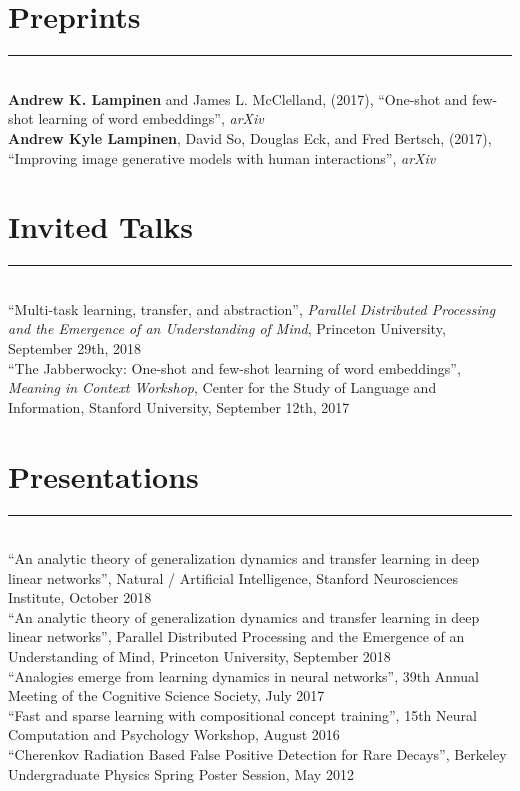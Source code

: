 \documentclass[margin]{res}
\begin{document}
\begin{resume}
\vspace{1pt}\section{Preprints} \vspace{-15pt} \rule{\textwidth}{0.5pt} \\[3pt]
\textbf{Andrew K. Lampinen} and James L. McClelland, (2017), {``One-shot and few-shot learning of word embeddings''}, \textit{arXiv} \\ [3pt] 
\textbf{Andrew Kyle Lampinen}, David So, Douglas Eck, and Fred Bertsch, (2017), {``Improving image generative models with human interactions''}, \textit{arXiv} 

\vspace{1pt}\section{Invited Talks} \vspace{-15pt} \rule{\textwidth}{0.5pt} \\[3pt]
{``Multi-task learning, transfer, and abstraction''}, \textit{Parallel Distributed Processing and the Emergence of an Understanding of Mind}, Princeton University, September 29th, 2018\\[3pt] 
{``The Jabberwocky: One-shot and few-shot learning of word embeddings''}, \textit{Meaning in Context Workshop}, Center for the Study of Language and Information,  Stanford University, September 12th, 2017 
 
\vspace{1pt}\section{Presentations} \vspace{-15pt} \rule{\textwidth}{0.5pt} \\[3pt]
{``An analytic theory of generalization dynamics and transfer learning in deep linear networks''}, Natural / Artificial Intelligence, Stanford Neurosciences Institute, October 2018\\[3pt]
{``An analytic theory of generalization dynamics and transfer learning in deep linear networks''}, Parallel Distributed Processing and the Emergence of an Understanding of Mind, Princeton University, September 2018\\[3pt]
{``Analogies emerge from learning dynamics in neural networks''}, 39th Annual Meeting of the Cognitive Science Society, July 2017\\[3pt]
{``Fast and sparse learning with compositional concept training''}, 15th Neural Computation and Psychology Workshop, August 2016\\[3pt]
{``Cherenkov Radiation Based False Positive Detection for Rare Decays''}, Berkeley Undergraduate Physics Spring Poster Session, May 2012


\end{resume}
\end{document}
